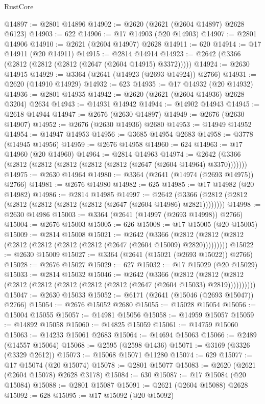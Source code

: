 \begin{lexlean}{RustCore}
\begin{coremodule}
@14897 := @2801 @14896
@14902 := @2620 (@2621 (@2604 @14897) @2628 @6123)
@14903 := 622
@14906 := @17 @14903 (@20 @14903)
@14907 := @2801 @14906
@14910 := @2621 (@2604 @14907) @2628
@14911 := 620
@14914 := @17 @14911 (@20 @14911)
@14915 := @2814 @14914
@14923 := @2642 (@3366 (@2812 (@2812 (@2812 (@2647 (@2604 @14915) @3372)))))
@14924 := @2630 @14915
@14929 := @3364 (@2641 (@14923 (@2693 @14924)) @2766)
@14931 := @2620 (@14910 @14929)
@14932 := 623
@14935 := @17 @14932 (@20 @14932)
@14936 := @2801 @14935
@14942 := @2620 (@2621 (@2604 @14936) @2628 @3204) @2634
@14943 := @14931 @14942
@14944 := @14902 @14943
@14945 := @2618 @14944
@14947 := @2676 (@2630 @14897)
@14949 := @2676 (@2630 @14907)
@14952 := @2676 (@2630 @14936) @2680
@14953 := @14949 @14952
@14954 := @14947 @14953
@14956 := @3685 @14954 @2683
@14958 := @3778 (@14945 @14956)
@14959 := @2676 @14958
@14960 := 624
@14963 := @17 @14960 (@20 @14960)
@14964 := @2814 @14963
@14974 := @2642 (@3366 (@2812 (@2812 (@2812 (@2812 (@2812 (@2647 (@2604 @14964) @3370)))))))
@14975 := @2630 @14964
@14980 := @3364 (@2641 (@14974 (@2693 @14975)) @2766)
@14981 := @2676 @14980
@14982 := 625
@14985 := @17 @14982 (@20 @14982)
@14986 := @2814 @14985
@14997 := @2642 (@3366 (@2812 (@2812 (@2812 (@2812 (@2812 (@2812 (@2647 (@2604 @14986) @2821))))))))
@14998 := @2630 @14986
@15003 := @3364 (@2641 (@14997 (@2693 @14998)) @2766)
@15004 := @2676 @15003
@15005 := 626
@15008 := @17 @15005 (@20 @15005)
@15009 := @2814 @15008
@15021 := @2642
    (@3366 (@2812 (@2812 (@2812 (@2812 (@2812 (@2812 (@2812 (@2647 (@2604 @15009) @2820)))))))))
@15022 := @2630 @15009
@15027 := @3364 (@2641 (@15021 (@2693 @15022)) @2766)
@15028 := @2676 @15027
@15029 := 627
@15032 := @17 @15029 (@20 @15029)
@15033 := @2814 @15032
@15046 := @2642
    (@3366
      (@2812 (@2812 (@2812 (@2812 (@2812 (@2812 (@2812 (@2812 (@2647 (@2604 @15033) @2819))))))))))
@15047 := @2630 @15033
@15052 := @6171 (@2641 (@15046 (@2693 @15047)) @2766)
@15054 := @2676 @15052 @2680
@15055 := @15028 @15054
@15056 := @15004 @15055
@15057 := @14981 @15056
@15058 := @14959 @15057
@15059 := @14892 @15058
@15060 := @14825 @15059
@15061 := @14759 @15060
@15063 := @14233 @15061 @2683
@15064 := @14694 @15063
@15066 := @2489 (@14557 @15064)
@15068 := @2595 (@2598 @1436)
@15071 := @3169 (@3326 (@3329 @2612))
@15073 := @15068 @15071 @11280
@15074 := 629
@15077 := @17 @15074 (@20 @15074)
@15078 := @2801 @15077
@15083 := @2620 (@2621 (@2604 @15078) @2628 @3178)
@15084 := 630
@15087 := @17 @15084 (@20 @15084)
@15088 := @2801 @15087
@15091 := @2621 (@2604 @15088) @2628
@15092 := 628
@15095 := @17 @15092 (@20 @15092)

\end{coremodule}
\end{lexlean}
